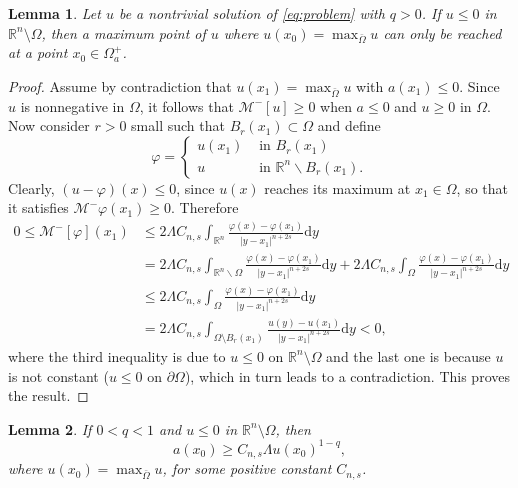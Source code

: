 \documentclass[11pt]{article}
\newcommand{\R}{\mathbb{R}}
\newtheorem{lemma}{Lemma}
\begin{document}
\begin{lemma}\label{lemma 5.1}
    Let \(u\) be a nontrivial solution of \eqref{eq:problem} with $q>0$. If $u\leq 0$ in $\mathbb{R}^n\setminus \Omega$, then a maximum point of $u$ where  \(u(x_0)=\max_{\bar\Omega} u\) can only be reached at a point \(x_0\in\Omega^{+}_a\).
\end{lemma}
 \begin{proof}
  Assume by contradiction that \(u(x_1) = \max_{\bar\Omega } u\)  with $a(x_1)\leq 0$. Since \(u\) is nonnegative in \(\Omega\), it follows that $\mathcal{M}^{-}[u]\geq 0$ when $a\leq 0$ and \(u\geq 0\) in \(\Omega\). Now consider $r>0$ small such that $B_r(x_1)\subset \Omega$ and define
\begin{equation*}
    \varphi = \begin{cases}
    u(x_1) & \text{ in } B_r(x_1) \\ 
    u & \text{ in } \mathbb{R}^{n}\backslash B_r(x_1).
    \end{cases}
\end{equation*}
Clearly, \((u-\varphi)(x) \leq 0\), since \(u(x)\) reaches its maximum at \(x_1\in \Omega\), so that it satisfies \(\mathcal{M}^{-}\varphi(x_1)\geq 0\). Therefore
\begin{align*}
    0\leq\mathcal{M}^{-}[\varphi](x_1) &\leq 2\Lambda C_{n,s}\int_{\mathbb{R}^n}\frac{\varphi(x) - \varphi(x_1)}{|y-x_1|^{n+2s}}\mathrm{d}y \\
    &= 2\Lambda C_{n,s}\int_{\mathbb{R}^n \backslash\Omega}\frac{\varphi(x) - \varphi(x_1)}{|y-x_1|^{n+2s}}\mathrm{d}y + 2\Lambda C_{n,s}\int_{\Omega}\frac{\varphi(x) - \varphi(x_1)}{|y-x_1|^{n+2s}}\mathrm{d}y \\
    & \leq2\Lambda C_{n,s}\int_{\Omega}\frac{\varphi(x) - \varphi(x_1)}{|y-x_1|^{n+2s}}\mathrm{d}y \\
    &= 2\Lambda C_{n,s}\int_{\Omega\setminus B_r(x_1)}\frac{u(y) - u(x_1)}{|y-x_1|^{n+2s}}\mathrm{d}y  <0,
\end{align*}
where the third inequality is due to $u\leq 0$ on $\R^n\setminus \Omega$ and the last one is because $u$ is not constant ($u\leq 0$ on $\partial \Omega$), which in turn leads to a contradiction. This proves the result.
\end{proof}

\begin{lemma}\label{limitação abaixo a(x_0) sublinear}
If $0<q<1$ and $u\le 0 $ in $\mathbb{R}^n\setminus \Omega$, then
    $$
    a(x_0)\geq C_{n,s}\Lambda u(x_0)^{1-q},
    $$
 where $u(x_0)=\max_{\bar\Omega} u$, for some positive constant $C_{n,s}$.  
\end{lemma}
\end{document}
